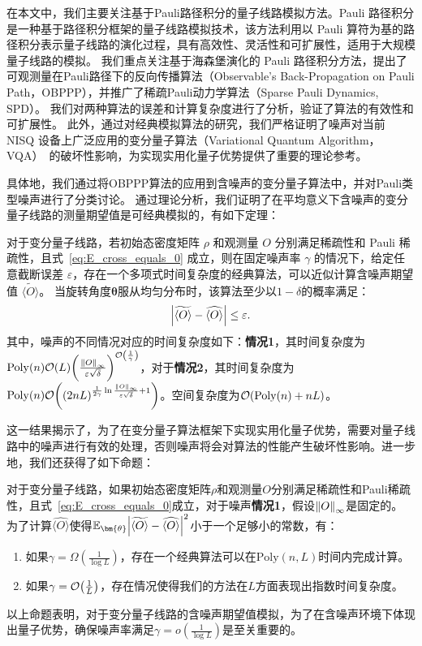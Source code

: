 在本文中，我们主要关注基于Pauli路径积分的量子线路模拟方法。Pauli 路径积分是一种基于路径积分框架的量子线路模拟技术，该方法利用以 Pauli 算符为基的路径积分表示量子线路的演化过程，具有高效性、灵活性和可扩展性，适用于大规模量子线路的模拟。
我们重点关注基于海森堡演化的 Pauli 路径积分方法，提出了可观测量在Pauli路径下的反向传播算法（Observable's Back-Propagation on Pauli Path，OBPPP），并推广了稀疏Pauli动力学算法（Sparse Pauli Dynamics, SPD）。
我们对两种算法的误差和计算复杂度进行了分析，验证了算法的有效性和可扩展性。
此外，通过对经典模拟算法的研究，我们严格证明了噪声对当前 NISQ 设备上广泛应用的变分量子算法（Variational Quantum Algorithm，VQA）~\cite{Cerezo2021variational,mcclean2016theory,tilly2022variational}的破坏性影响，为实现实用化量子优势提供了重要的理论参考。

具体地，我们通过将OBPPP算法的应用到含噪声的变分量子算法中，并对Pauli类型噪声进行了分类讨论。
通过理论分析，我们证明了在平均意义下含噪声的变分量子线路的测量期望值是可经典模拟的，有如下定理：
\begin{theorem}[非正式]
    对于变分量子线路，若初始态密度矩阵 $\rho$ 和观测量 $O$ 分别满足稀疏性和 Pauli 稀疏性，且式~\eqref{eq:E_cross_equals_0} 成立，则在固定噪声率 $\gamma$ 的情况下，给定任意截断误差 $\varepsilon$，存在一个多项式时间复杂度的经典算法，可以近似计算含噪声期望值 $\widetilde{\langle O\rangle}$。
    当旋转角度$\bm{\theta}$服从均匀分布时，该算法至少以$1-\delta$的概率满足：
    $$\abs{\widetilde{\langle O\rangle}-\widehat{\langle O\rangle}} \leq \varepsilon.$$
    其中，噪声的不同情况对应的时间复杂度如下：\textbf{情况1}，其时间复杂度为$\mathrm{Poly}(n) \order{L} \bigg(\frac{\norm{O}_\infty}{\varepsilon \sqrt{\delta}} \bigg)^{\order{\frac{1}{\gamma}}}$，对于\textbf{情况2}，其时间复杂度为$\mathrm{Poly}(n)  \order{(2nL)^{\frac{1}{2\gamma} \ln{\frac{\norm{O}_\infty}{\varepsilon \sqrt{\delta}}}+1}}$。空间复杂度为$\order{\mathrm{Poly}(n)+nL}$。
\end{theorem}

这一结果揭示了，为了在变分量子算法框架下实现实用化量子优势，需要对量子线路中的噪声进行有效的处理，否则噪声将会对算法的性能产生破坏性影响。进一步地，我们还获得了如下命题：
\begin{proposition}
    对于变分量子线路，如果初始态密度矩阵$\rho$和观测量$O$分别满足稀疏性和Pauli稀疏性，且式~\eqref{eq:E_cross_equals_0}成立，对于噪声\textbf{情况1}，假设$\norm{O}_\infty$是固定的。
    为了计算$\widehat{\langle O\rangle}$使得$\mathbb{E}_{\bm{\theta}}\abs{\widetilde{\langle O\rangle}-\widehat{\langle O\rangle}}^2$小于一个足够小的常数，有：
    \begin{enumerate}
        \item 如果$\gamma=\Omega(\frac{1}{\log{L}})$，存在一个经典算法可以在$\mathrm{Poly}\left(n,L\right)$时间内完成计算。
        \item 如果$\gamma=\order{\frac{1}{L}}$，存在情况使得我们的方法在$L$方面表现出指数时间复杂度。
    \end{enumerate}
\end{proposition}
以上命题表明，对于变分量子线路的含噪声期望值模拟，为了在含噪声环境下体现出量子优势，确保噪声率满足$\gamma=o(\frac{1}{\log{L}})$是至关重要的。


